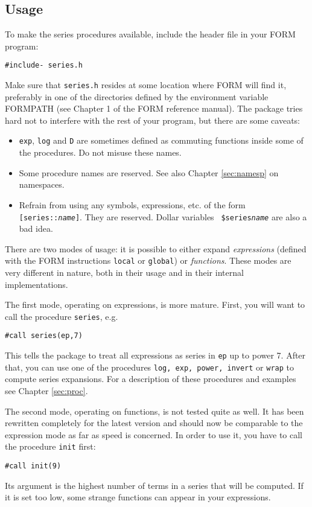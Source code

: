 \documentclass{article}
\begin{document}
\subsection{Usage}
\label{sec:usage}

To make the series procedures available, include the header file in your
FORM program:
\begin{verbatim}
#include- series.h
\end{verbatim}
Make sure that {\tt series.h} resides at some location where FORM will find
it, preferably in one of the directories defined by the environment
variable \mbox{FORMPATH} (see Chapter 1 of the FORM reference manual). The
package tries hard not to interfere with the rest of your program, but
there are some caveats:
\begin{itemize}
\item {\tt exp}, {\tt log} and {\tt D} are sometimes defined as commuting
  functions inside some of the procedures. Do not misuse these names.
\item Some procedure names are reserved. See also Chapter
  \ref{sec:namesp} on namespaces.
\item Refrain from  using any symbols, expressions, etc. of the form
  {\tt[series::{\it name}]}. They are reserved. Dollar variables {\tt
    \$series{\it name}} are also a bad idea.
\end{itemize}

There are two modes of usage: it is possible to either expand {\em expressions}
(defined with the FORM instructions {\tt local} or {\tt global}) or {\em
  functions}. These modes are very different in nature, both in their
usage and in their internal implementations. 

The first mode, operating on expressions, is more mature. 
First, you will want to
call the procedure {\tt series}, e.g.
\begin{verbatim}
#call series(ep,7)
\end{verbatim}
This tells the package to treat all expressions as series in {\tt ep} up
to power 7. After that, you can use one of the procedures {\tt log, exp,
  power, invert} or {\tt wrap} to compute series expansions. For a
description of these procedures and examples see Chapter \ref{sec:proc}.

\medskip

The second mode, operating on functions, is not tested quite as
well. It has been rewritten completely for the latest version and should
now be comparable to the expression mode as far as speed is concerned. 
In order to use it, you have to call the procedure {\tt init} first:
\begin{verbatim}
#call init(9)
\end{verbatim}
Its argument is the highest number of terms in a series that will be
computed. If it is set too low, some strange functions can appear in
your expressions.
\end{document}
